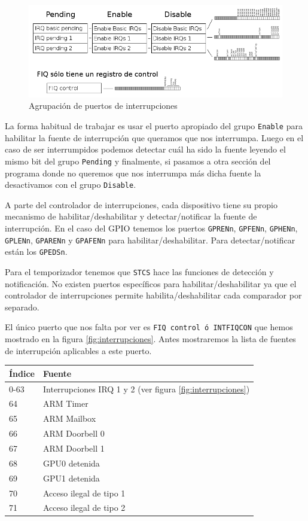 \begin{figure}[h]
  \centering
    \includegraphics[width=15cm]{graphs/interrupcionesgrupos.png}
  \caption{Agrupación de puertos de interrupciones}
  \label{fig:interrupcionesgrupos}
\end{figure}

La forma habitual de trabajar es usar el puerto apropiado del grupo {\tt Enable} para
habilitar la fuente de interrupción que queramos que nos interrumpa. Luego en el caso de
ser interrumpidos podemos detectar cuál ha sido la fuente leyendo el mismo bit del
grupo {\tt Pending} y finalmente, si pasamos a otra sección del programa donde no queremos
que nos interrumpa más dicha fuente la desactivamos con el grupo {\tt Disable}.

A parte del controlador de interrupciones, cada dispositivo tiene su propio mecanismo de
habilitar/deshabilitar y detectar/notificar la fuente de interrupción. En el caso del GPIO tenemos
los puertos {\tt GPRENn}, {\tt GPFENn}, {\tt GPHENn}, {\tt GPLENn}, {\tt GPARENn} y {\tt GPAFENn}
para habilitar/deshabilitar. Para detectar/notificar están los {\tt GPEDSn}.

Para el temporizador tenemos que {\tt STCS} hace las funciones de detección y notificación. No
existen puertos específicos para habilitar/deshabilitar ya que el controlador de
interrupciones permite habilita/deshabilitar cada comparador por separado.

El único puerto que nos falta por ver es {\tt FIQ control ó INTFIQCON} que hemos
mostrado en la figura \ref{fig:interrupciones}. Antes mostraremos la lista de fuentes
de interrupción aplicables a este puerto.

\begin{longtable}{ p{2cm} | p{6cm}}
\hline
{\bf Índice} & {\bf Fuente} \\ \hline
0-63  & Interrupciones IRQ 1 y 2 (ver figura \ref{fig:interrupciones})  \\ \hline
64    & ARM Timer  \\ \hline
65    & ARM Mailbox \\ \hline
66    & ARM Doorbell 0 \\ \hline
67    & ARM Doorbell 1 \\ \hline
68    & GPU0 detenida \\ \hline
69    & GPU1 detenida \\ \hline
70    & Acceso ilegal de tipo 1 \\ \hline
71    & Acceso ilegal de tipo 2 \\ \hline
\end{longtable}

